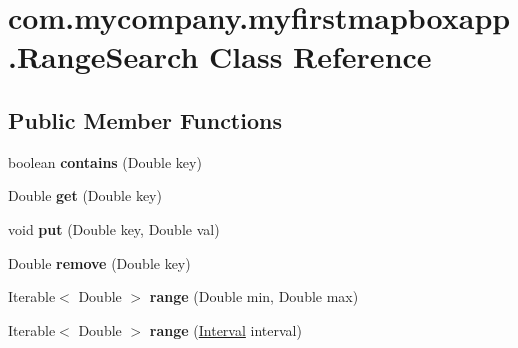 \hypertarget{classcom_1_1mycompany_1_1myfirstmapboxapp_1_1_range_search}{}\section{com.\+mycompany.\+myfirstmapboxapp.\+Range\+Search Class Reference}
\label{classcom_1_1mycompany_1_1myfirstmapboxapp_1_1_range_search}
\subsection*{Public Member Functions}
\begin{DoxyCompactItemize}
\item 
\mbox{\label{classcom_1_1mycompany_1_1myfirstmapboxapp_1_1_range_search_ab2bb9a7bc4137f2703f68717f8c6849a}} 
boolean {\bfseries contains} (Double key)
\item 
\mbox{\label{classcom_1_1mycompany_1_1myfirstmapboxapp_1_1_range_search_af34019faeac6add251f6e1f709c2e635}} 
Double {\bfseries get} (Double key)
\item 
\mbox{\label{classcom_1_1mycompany_1_1myfirstmapboxapp_1_1_range_search_ae24de0d82abf985e8d13324c9ee726df}} 
void {\bfseries put} (Double key, Double val)
\item 
\mbox{\label{classcom_1_1mycompany_1_1myfirstmapboxapp_1_1_range_search_a4969234c70f5df6d03610da11edf3f81}} 
Double {\bfseries remove} (Double key)
\item 
\mbox{\label{classcom_1_1mycompany_1_1myfirstmapboxapp_1_1_range_search_ade65f0b3a071f3734ab43161a396d1f3}} 
Iterable$<$ Double $>$ {\bfseries range} (Double min, Double max)
\item 
\mbox{\label{classcom_1_1mycompany_1_1myfirstmapboxapp_1_1_range_search_a8b079e37b6dd1c816969eb0ce7c67294}} 
Iterable$<$ Double $>$ {\bfseries range} (\hyperlink{classcom_1_1mycompany_1_1myfirstmapboxapp_1_1_interval}{Interval} interval)

\end{DoxyCompactItemize}
